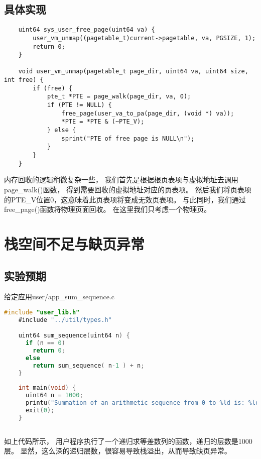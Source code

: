 \subsection{具体实现}

\begin{lstlisting}
    uint64 sys_user_free_page(uint64 va) {
        user_vm_unmap((pagetable_t)current->pagetable, va, PGSIZE, 1);
        return 0;
    }  
    
    void user_vm_unmap(pagetable_t page_dir, uint64 va, uint64 size, int free) {
        if (free) {
            pte_t *PTE = page_walk(page_dir, va, 0);
            if (PTE != NULL) {
                free_page(user_va_to_pa(page_dir, (void *) va));
                *PTE = *PTE & (~PTE_V);
            } else {
                sprint("PTE of free page is NULL\n");
            }
        }
    }    
\end{lstlisting}

内存回收的逻辑稍微复杂一些，
我们首先是根据根页表项与虚拟地址去调用page\_walk()函数，
得到需要回收的虚拟地址对应的页表项。
然后我们将页表项的PTE\_V位置0，这意味着此页表项将变成无效页表项。
与此同时，我们通过free\_page()函数将物理页面回收。
在这里我们只考虑一个物理页。

\section{栈空间不足与缺页异常}

\subsection{实验预期}

给定应用user/app\_sum\_sequence.c

\begin{lstlisting}[caption={用户态应用app\_sum\_sequence.c}, label={lst:app_sum_sequence}, language=C]
    #include "user_lib.h"
    #include "../util/types.h"

    uint64 sum_sequence(uint64 n) {
      if (n == 0)
        return 0;
      else
        return sum_sequence( n-1 ) + n;
    }
    
    int main(void) {
      uint64 n = 1000;
      printu("Summation of an arithmetic sequence from 0 to %ld is: %ld \n", n, sum_sequence(n) );
      exit(0);
    }
        
\end{lstlisting}

如上代码所示，
用户程序执行了一个递归求等差数列的函数，递归的层数是1000层。
显然，这么深的递归层数，很容易导致栈溢出，从而导致缺页异常。

